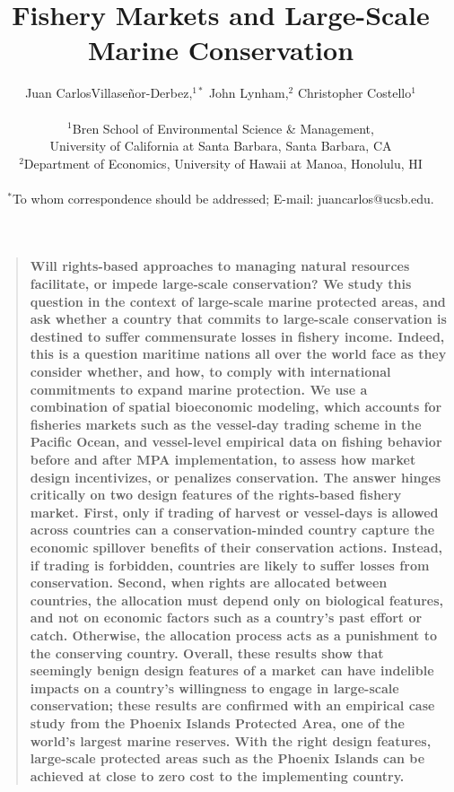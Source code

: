 \documentclass[12pt]{article}
\title{Fishery Markets and Large-Scale Marine Conservation}
\author{Juan CarlosVillase\~{n}or-Derbez,$^{1\ast}$ John Lynham,$^{2}$ Christopher Costello$^{1}$\\
\\
\normalsize{$^{1}$Bren School of Environmental Science \& Management,}\\
\normalsize{University of California at Santa Barbara, Santa Barbara, CA}\\
\normalsize{$^{2}$Department of Economics, University of Hawaii at Manoa, Honolulu, HI}\\
\\
\normalsize{$^\ast$To whom correspondence should be addressed; E-mail: juancarlos@ucsb.edu.}
}
\date{}
\newenvironment{sciabstract}{%
\begin{quote} \bf}
{\end{quote}}
\begin{document}

\baselineskip24pt


\maketitle



\begin{sciabstract}
Will rights-based approaches to managing natural resources facilitate, or impede large-scale conservation? We study this question in the context of large-scale marine protected areas, and ask whether a country that commits to large-scale conservation is destined to suffer commensurate losses in fishery income.  Indeed, this is a question maritime nations all over the world face as they consider whether, and how, to comply with international commitments to expand marine protection. We use a combination of spatial bioeconomic modeling, which accounts for fisheries markets such as the vessel-day trading scheme in the Pacific Ocean, and vessel-level empirical data on fishing behavior before and after MPA implementation, to assess how market design incentivizes, or penalizes conservation. The answer hinges critically on two design features of the rights-based fishery market. First, only if trading of harvest or vessel-days is allowed across countries can a conservation-minded country capture the economic spillover benefits of their conservation actions.  Instead, if trading is forbidden, countries are likely to suffer losses from conservation. Second, when rights are allocated between countries, the allocation must depend only on biological features, and not on economic factors such as a country's past effort or catch. Otherwise, the allocation process acts as a punishment to the conserving country. Overall, these results show that seemingly benign design features of a market can have indelible impacts on a country's willingness to engage in large-scale conservation; these results are confirmed with an empirical case study from the Phoenix Islands Protected Area, one of the world's largest marine reserves. With the right design features, large-scale protected areas such as the Phoenix Islands can be achieved at close to zero cost to the implementing country.
\end{sciabstract}

\end{document}
